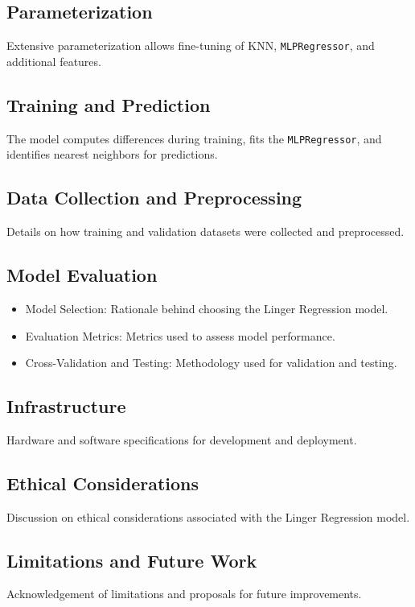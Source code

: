 \documentclass[a4paper, 12pt]{report}
\begin{document}
\subsection{Parameterization}
Extensive parameterization allows fine-tuning of KNN, \texttt{MLPRegressor}, and additional features.

\subsection{Training and Prediction}
The model computes differences during training, fits the \texttt{MLPRegressor}, and identifies nearest neighbors for predictions.

\subsection{Data Collection and Preprocessing}
Details on how training and validation datasets were collected and preprocessed.

\subsection{Model Evaluation}
\begin{itemize}
    \item Model Selection: Rationale behind choosing the Linger Regression model.
    \item Evaluation Metrics: Metrics used to assess model performance.
    \item Cross-Validation and Testing: Methodology used for validation and testing.
\end{itemize}

\subsection{Infrastructure}
Hardware and software specifications for development and deployment.

\subsection{Ethical Considerations}
Discussion on ethical considerations associated with the Linger Regression model.

\subsection{Limitations and Future Work}
Acknowledgement of limitations and proposals for future improvements.
\end{document}
